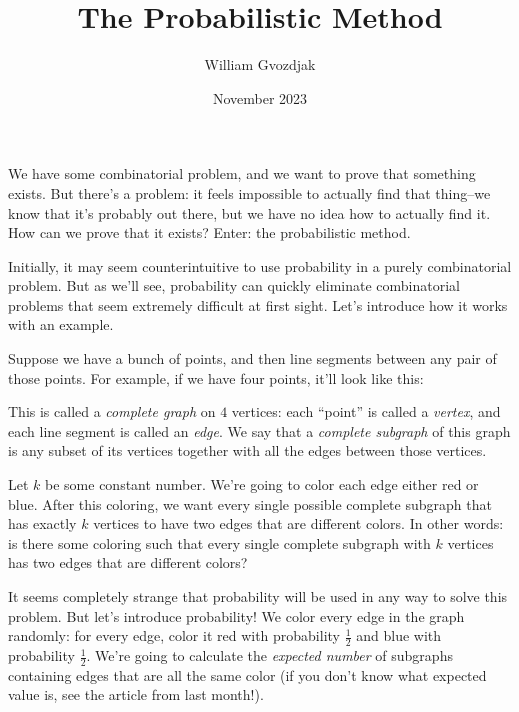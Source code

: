 \documentclass{article}
\title{The Probabilistic Method}
\author{William Gvozdjak}
\date{November 2023}
\begin{document}
\maketitle

We have some combinatorial problem, and we want to prove that something exists. But there's a problem: it feels impossible to actually find that thing--we know that it's probably out there, but we have no idea how to actually find it. How can we prove that it exists? Enter: the probabilistic method.

Initially, it may seem counterintuitive to use probability in a purely combinatorial problem. But as we'll see, probability can quickly eliminate combinatorial problems that seem extremely difficult at first sight. Let's introduce how it works with an example.

Suppose we have a bunch of points, and then line segments between any pair of those points. For example, if we have four points, it'll look like this:

\begin{center}
\end{center}

This is called a \emph{complete graph} on $4$ vertices: each ``point'' is called a \emph{vertex}, and each line segment is called an \emph{edge}. We say that a \emph{complete subgraph} of this graph is any subset of its vertices together with all the edges between those vertices.

Let $k$ be some constant number. We're going to color each edge either red or blue. After this coloring, we want every single possible complete subgraph that has exactly $k$ vertices to have two edges that are different colors. In other words: is there some coloring such that every single complete subgraph with $k$ vertices has two edges that are different colors?

It seems completely strange that probability will be used in any way to solve this problem. But let's introduce probability! We color every edge in the graph randomly: for every edge, color it red with probability $\frac{1}{2}$ and blue with probability $\frac{1}{2}$. We're going to calculate the \emph{expected number} of subgraphs containing edges that are all the same color (if you don't know what expected value is, see the article from last month!).
\end{document}
